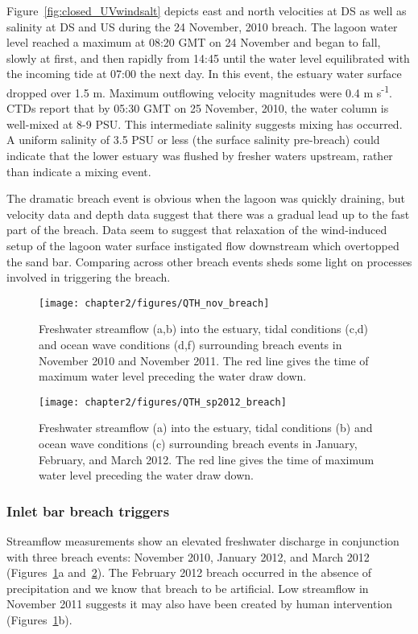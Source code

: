Figure~\ref{fig:closed_UVwindsalt} depicts east and north velocities at DS as well as salinity at DS and US during the 24 November, 2010 breach. The lagoon water level reached a maximum at 08:20 GMT on 24 November and began to fall, slowly at first, and then rapidly from 14:45 until the water level equilibrated with the incoming tide at 07:00 the next day. In this event, the estuary water surface dropped over 1.5 m. Maximum outflowing velocity magnitudes were 0.4 m s\textsuperscript{-1}. CTDs report that by 05:30 GMT on 25 November, 2010, the water column is well-mixed at 8-9 PSU. This intermediate salinity suggests mixing has occurred. A uniform salinity of 3.5 PSU or less (the surface salinity pre-breach) could indicate that the lower estuary was flushed by fresher waters upstream, rather than indicate a mixing event.

The dramatic breach event is obvious when the lagoon was quickly draining, but velocity data and depth data suggest that there was a gradual lead up to the fast part of the breach. Data seem to suggest that relaxation of the wind-induced setup of the lagoon water surface instigated flow downstream which overtopped the sand bar. Comparing across other breach events sheds some light on processes involved in triggering the breach. 



\begin{figure}[h]
\centering
	\texttt{[image: chapter2/figures/QTH\_nov\_breach]}
\caption{Freshwater streamflow (a,b) into the estuary, tidal conditions (c,d) and ocean wave conditions (d,f) surrounding breach events in November 2010 and November 2011. The red line gives the time of maximum water level preceding the water draw down.} \label{fig:QbreachNov}
\end{figure}


\begin{figure}[h]
\centering
\texttt{[image: chapter2/figures/QTH\_sp2012\_breach]}
\caption{Freshwater streamflow (a) into the estuary, tidal conditions (b) and ocean wave conditions (c) surrounding breach events in January, February, and March 2012. The red line gives the time of maximum water level preceding the water draw down.} \label{fig:QbreachSpring2012}
\end{figure}


\subsubsection{Inlet bar breach triggers}
Streamflow measurements show an elevated freshwater discharge in conjunction with three breach events: November 2010, January 2012, and March 2012 (Figures~\ref{fig:QbreachNov}a and~\ref{fig:QbreachSpring2012}). The February 2012 breach occurred in the absence of precipitation and we know that breach to be artificial. Low streamflow in November 2011 suggests it may also have been created by human intervention (Figures~\ref{fig:QbreachNov}b). 


